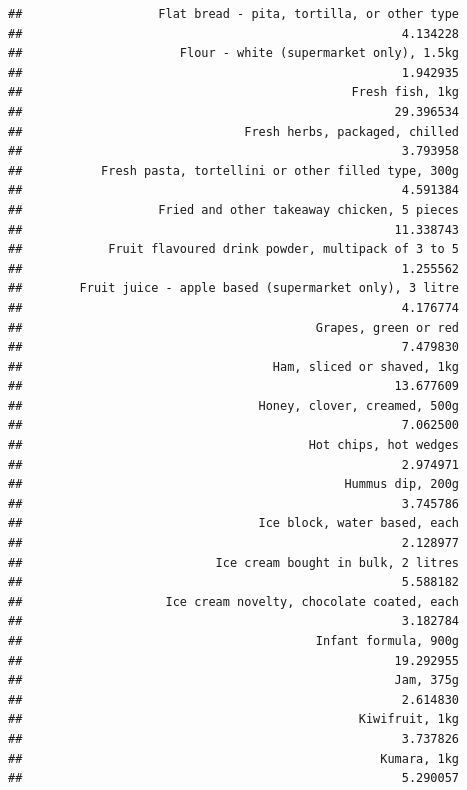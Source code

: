 \documentclass[
  landscape]{article}
\begin{document}
\begin{verbatim}
##                   Flat bread - pita, tortilla, or other type 
##                                                     4.134228 
##                      Flour - white (supermarket only), 1.5kg 
##                                                     1.942935 
##                                              Fresh fish, 1kg 
##                                                    29.396534 
##                               Fresh herbs, packaged, chilled 
##                                                     3.793958 
##           Fresh pasta, tortellini or other filled type, 300g 
##                                                     4.591384 
##                   Fried and other takeaway chicken, 5 pieces 
##                                                    11.338743 
##            Fruit flavoured drink powder, multipack of 3 to 5 
##                                                     1.255562 
##        Fruit juice - apple based (supermarket only), 3 litre 
##                                                     4.176774 
##                                         Grapes, green or red 
##                                                     7.479830 
##                                   Ham, sliced or shaved, 1kg 
##                                                    13.677609 
##                                 Honey, clover, creamed, 500g 
##                                                     7.062500 
##                                        Hot chips, hot wedges 
##                                                     2.974971 
##                                             Hummus dip, 200g 
##                                                     3.745786 
##                                 Ice block, water based, each 
##                                                     2.128977 
##                           Ice cream bought in bulk, 2 litres 
##                                                     5.588182 
##                    Ice cream novelty, chocolate coated, each 
##                                                     3.182784 
##                                         Infant formula, 900g 
##                                                    19.292955 
##                                                    Jam, 375g 
##                                                     2.614830 
##                                               Kiwifruit, 1kg 
##                                                     3.737826 
##                                                  Kumara, 1kg 
##                                                     5.290057 

\end{verbatim}
\end{document}
